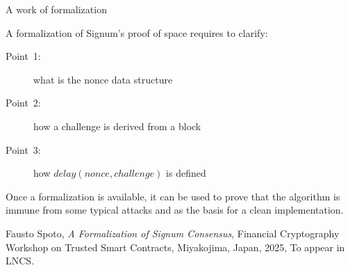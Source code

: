 \documentclass[11pt]{beamer}  %
\newcommand{\nonce}{{\mathit{nonce}}}
\newcommand{\challenge}{{\mathit{challenge}}}
\newcommand{\delay}{{\mathit{delay}}}
\begin{document}
\begin{frame}{A work of formalization}

  A formalization of Signum's proof of space requires to clarify:
  \begin{description}
  \item[Point~1:] what is the nonce data structure
  \item[Point~2:] how a challenge is derived from a block
  \item[Point~3:] how $\delay(\nonce,\challenge)$ is defined
  \end{description}

  \pause

  \medskip

  Once a formalization is available, it can be used to \alert{prove} that
  the algorithm is immune from some typical attacks and as the basis for
  a clean implementation.

  \bigskip

  \begin{greenbox}{}
    Fausto Spoto, \emph{A Formalization of Signum Consensus},
    Financial Cryptography Workshop on Trusted Smart Contracts,
    Miyakojima, Japan, 2025, To appear in LNCS.
  \end{greenbox}

\end{frame}
\end{document}
